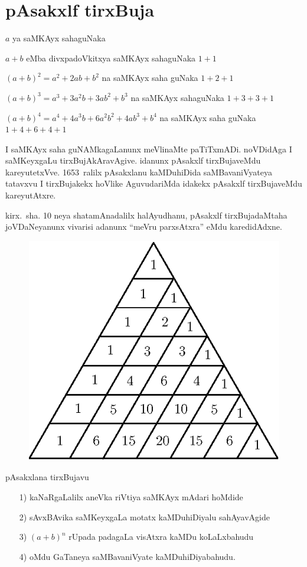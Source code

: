 \chapter{pAsakxlf tirxBuja}

\vskip -25pt
\noindent
$a$ ya saMKAyx sahaguNaka 

\noindent
$a+b$ eMba divxpadoVkitxya saMKAyx sahaguNaka \quad $1+1$

\noindent
$(a+b)^2=a^2+2ab+b^2$ na saMKAyx saha guNaka \quad $1+2+1$

\noindent
$(a+b)^3=a^3+3a^2b+3ab^2+b^3$ na saMKAyx sahaguNaka \quad $1+3+3+1$

\noindent
$(a+b)^4=a^4+4a^3b+6a^2b^2+4ab^3+b^4$ na saMKAyx saha guNaka \quad $1+4+6+4+1$

I saMKAyx saha guNAMkagaLanunx meVlinaMte paTiTxmADi. noVDidAga I saMKeyxgaLu tirxBujAkAravAgive. idanunx pAsakxlf tirxBujaveMdu kareyutetxVve. {\rm 1653}~ralilx pAsakxlanu kaMDuhiDida saMBavaniVyateya tatavxvu I tirxBujakekx hoVlike AguvudariMda idakekx pAsakxlf tirxBujaveMdu kareyutAtxre.

kirx.~sha. {\rm 10} neya shatamAnadalilx halAyudhanu, pAsakxlf tirxBujadaMtaha joVDaNe\-yanunx vivarisi adanunx ``meVru parxsAtxra'' eMdu karedidAdxne.
\begin{center}
\begin{figure}[H]
\centering
\includegraphics[scale=.8]{src/figures/m_151.eps}
\end{figure}
\end{center}
pAsakxlana tirxBujavu
\begin{enumerate}
\item[{\rm 1)}] kaNaRgaLalilx aneVka riVtiya saMKAyx mAdari hoMdide
\item[{\rm 2)}] sAvxBAvika saMKeyxgaLa motatx kaMDuhiDiyalu sahAyavAgide
\item[{\rm 3)}] $(a+b)^n$ rUpada padagaLa visAtxra kaMDu koLaLxbahudu
\item[{\rm 4)}] oMdu GaTaneya saMBavaniVyate kaMDuhiDiyabahudu.
\end{enumerate}

